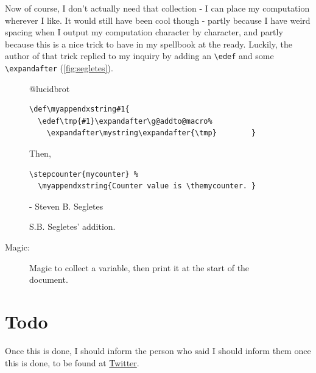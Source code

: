 \documentclass{article} \usepackage[utf8]{inputenc}
\makeatletter
\newcommand{\code}[1]{\colorbox{codebggray}{{\texttt{#1}}}}
\def\mystring{} %
\def\thefinalstring{} %
\def\myappendstring#1{\g@addto@macro\mystring{ #1}}
\def\myappendxstring#1{\edef\tmp{#1}\expandafter\g@addto@macro\expandafter\mystring\expandafter{\tmp}}
\makeatother
\begin{document}
Now of course, I don't actually need that collection - I can place my computation wherever I like. It would still have been cool though - partly because I have weird spacing when I output my computation character by character, and partly because this is a nice trick to have in my spellbook at the ready. Luckily, the author of that trick replied to my inquiry by adding an \code{\textbackslash edef} and some \cprotect\code{\verb|\expandafter|} (\autoref{fig:segletes}).

\begin{figure}[hp]
\begin{myquote}
@lucidbrot
\begin{lstlisting}[columns=fullflexible, backgroundcolor = \color{codebggray}]
\def\myappendxstring#1{
  \edef\tmp{#1}\expandafter\g@addto@macro%
    \expandafter\mystring\expandafter{\tmp}        }
\end{lstlisting}
Then, \begin{lstlisting}[columns=fullflexible, backgroundcolor = \color{codebggray}]
\stepcounter{mycounter} %
  \myappendxstring{Counter value is \themycounter. }
\end{lstlisting}
 - Steven B. Segletes 
\end{myquote}
\caption{S.B. Segletes' addition.}
\label{fig:segletes}
\end{figure}

\makeatletter
{}%
\makeatother
Magic: \thefinalstring
\addtocontents{xyz}{\gdef\protect\thefinalstring{\mystring}}

\begin{figure}[htbp]
\begin{mycode}
\myappendstring{hello}
\makeatletter
{}%
\makeatother
\thefinalstring
\addtocontents{xyz}{\gdef\protect\thefinalstring{\mystring}}
\end{mycode}
\caption{Magic to collect a variable, then print it at the start of the document. }
\label{fig:magic}
\end{figure}

\section{Todo}
Once this is done, I should inform the person who said I should inform them once this is done, to be found at \href{https://twitter.com/LucidBrot/status/1290792953548615682}{Twitter}.
\end{document}

